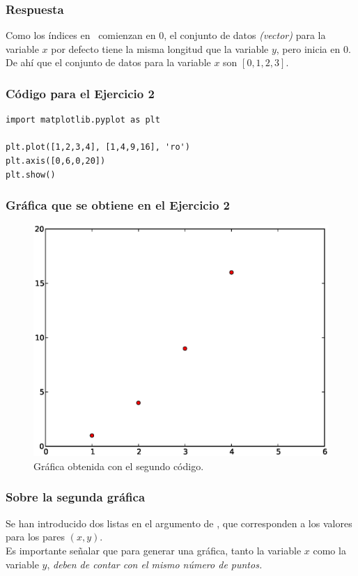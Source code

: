 \begin{frame}
\frametitle{Respuesta}	
Como los índices en \python\ comienzan en $0$, el conjunto de datos \emph{(vector)} para la variable $x$ por defecto tiene la misma longitud que la variable $y$, pero inicia en $0$. 
\\
\bigskip
De ahí que el conjunto de datos para la variable $x$ son $[0, 1, 2, 3]$.
\end{frame}
\begin{frame}[fragile]
\frametitle{Código para el Ejercicio 2}
\begin{lstlisting}[style=codigopython]
import matplotlib.pyplot as plt

plt.plot([1,2,3,4], [1,4,9,16], 'ro')
plt.axis([0,6,0,20])
plt.show()
\end{lstlisting}
\end{frame}
\begin{frame}[fragile]
\frametitle{Gráfica que se obtiene en el Ejercicio 2}
\begin{figure}
    \centering
	\includegraphics[scale=0.35]{Imagenes/plotEjercicio2.eps}
 	\caption{Gráfica obtenida con el segundo código.}
\end{figure}
\end{frame}
\begin{frame}[fragile]
\frametitle{Sobre la segunda gráfica}
Se han introducido dos listas en el argumento de , que corresponden a los valores para los pares $(x, y)$.
\\
\bigskip
Es importante señalar que para generar una gráfica, tanto la variable $x$ como la variable $y$, \emph{deben de contar con el mismo número de puntos.}
\end{frame}
